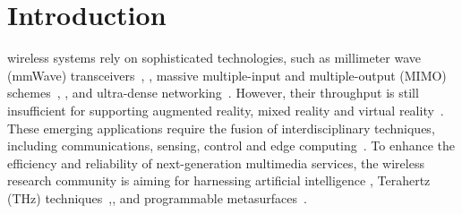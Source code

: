 \documentclass[lettersize,journal]{IEEEtran}
\theoremstyle{remark}
\begin{document}
\section{Introduction}
 wireless systems rely on sophisticated technologies, such as millimeter wave (mmWave) transceivers~\cite{li2020dynamic}, \cite{tang2022path}, massive multiple-input and multiple-output (MIMO) schemes~\cite{li2023uav}, \cite{du2022tensor}, and ultra-dense networking~\cite{wu2020user}. However, their throughput is still insufficient for supporting augmented reality, mixed reality and virtual reality~\cite{torres2020immersive}. These emerging applications require the fusion of interdisciplinary techniques, including communications, sensing, control and edge computing~\cite{liu2024next}. To enhance the efficiency and reliability of next-generation multimedia services, the wireless research community is aiming for harnessing artificial intelligence \cite{zhu2020toward}, Terahertz (THz) techniques~\cite{xu2021graph},\cite{dai2022delay}, and programmable metasurfaces~\cite{wu2021intelligent}.
\end{document}
